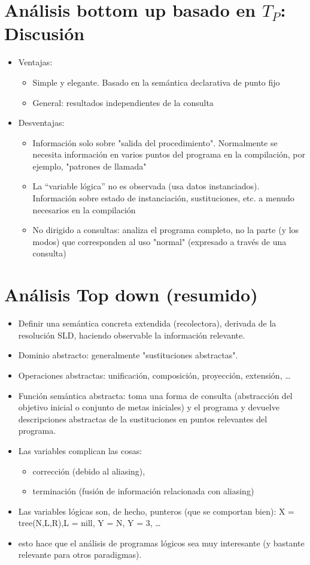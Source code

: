 \documentclass[11pt]{article}
\begin{document}
\section*{Análisis \textbf{bottom up} basado en \(T_P\): Discusión}
\label{sec:org11ef9ee}
\begin{itemize}
\item Ventajas:
\begin{itemize}
\item Simple y elegante. Basado en la semántica declarativa de punto fijo
\item General: resultados independientes de la consulta
\end{itemize}
\item Desventajas:
\begin{itemize}
\item Información solo sobre "salida del procedimiento". Normalmente se
necesita información en varios puntos del programa en la compilación, por ejemplo, "patrones de llamada"
\item La “variable lógica” no es observada (usa datos
instanciados). Información sobre estado de instanciación,
sustituciones, etc. a menudo necesarios en la compilación
\item No dirigido a consultas: analiza el programa completo, no la parte
(y los modos) que corresponden al uso "normal" (expresado a través
de una consulta)
\end{itemize}
\end{itemize}

\section*{Análisis \textbf{Top down} (resumido)}
\label{sec:org7d35ab6}
\begin{itemize}
\item Definir una semántica concreta extendida (recolectora), derivada de
la resolución SLD, haciendo observable la información relevante.
\item Dominio abstracto: generalmente "sustituciones abstractas".
\item Operaciones abstractas: unificación, composición, proyección, extensión, \ldots{}
\item Función semántica abstracta: toma una forma de consulta (abstracción
del objetivo inicial o conjunto de metas iniciales) y el programa y
devuelve descripciones abstractas de la sustituciones en puntos relevantes del programa.
\item Las variables complican las cosas:
\begin{itemize}
\item corrección (debido al aliasing),
\item terminación (fusión de información relacionada con aliasing)
\end{itemize}
\item Las variables lógicas son, de hecho, punteros (que se comportan
bien): 
X = tree(N,L,R),L = nill, Y = N, Y = 3, \ldots{}

\item esto hace que el análisis de programas lógicos sea muy interesante (y bastante relevante para otros paradigmas).
\end{itemize}
\end{document}
